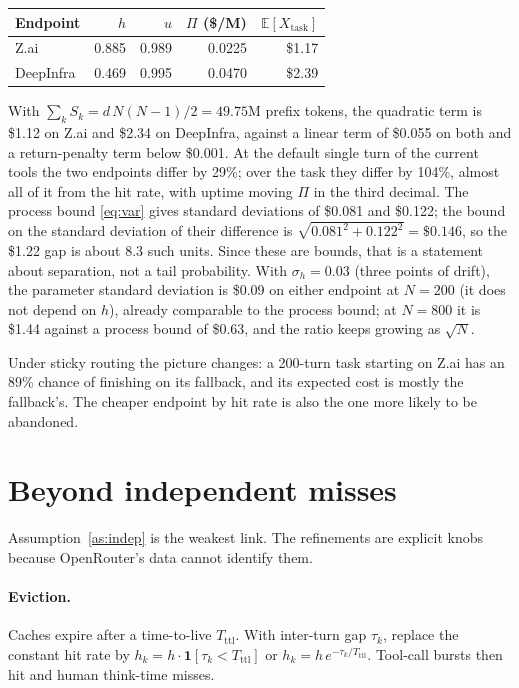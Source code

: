 \documentclass[11pt]{article}
\newcommand{\E}{\mathbb{E}}
\newcommand{\ind}{\mathbf{1}}
\begin{document}
\begin{center}
\begin{tabular}{@{}lrrrr@{}}
\toprule
Endpoint & $h$ & $u$ & $\Pi$ (\$/M) & $\E[X_{\text{task}}]$ \\
\midrule
Z.ai      & 0.885 & 0.989 & 0.0225 & \$1.17 \\
DeepInfra & 0.469 & 0.995 & 0.0470 & \$2.39 \\
\bottomrule
\end{tabular}
\end{center}

With $\sum_k S_k = d\,N(N-1)/2 = 49.75$M prefix tokens, the quadratic term is
\$1.12 on Z.ai and \$2.34 on DeepInfra, against a linear term of \$0.055 on
both and a return-penalty term below \$0.001. At the default single turn of the
current tools the two endpoints differ by 29\%; over the task they differ by
104\%, almost all of it from the hit rate, with uptime moving $\Pi$ in the
third decimal. The process bound \eqref{eq:var} gives standard deviations of
\$0.081 and \$0.122; the bound on the standard deviation of their difference is
$\sqrt{0.081^2 + 0.122^2} = \$0.146$, so the \$1.22 gap is about 8.3 such
units. Since these are bounds, that is a statement about separation, not a tail
probability. With $\sigma_h = 0.03$ (three points of drift), the parameter
standard deviation is \$0.09 on either endpoint at $N = 200$ (it does not
depend on $h$), already comparable to the process bound; at $N = 800$ it is
\$1.44 against a process bound of \$0.63, and the ratio keeps growing as
$\sqrt{N}$.

Under \textsf{sticky} routing the picture changes: a 200-turn task starting on
Z.ai has an 89\% chance of finishing on its fallback, and its expected cost is
mostly the fallback's. The cheaper endpoint by hit rate is also the one more
likely to be abandoned.

\section{Beyond independent misses}\label{sec:beyond}

Assumption~\ref{as:indep} is the weakest link. The refinements are explicit
knobs because OpenRouter's data cannot identify them.

\paragraph{Eviction.}
Caches expire after a time-to-live $T_{\text{ttl}}$. With inter-turn gap
$\tau_k$, replace the constant hit rate by
$h_k = h \cdot \ind[\tau_k < T_{\text{ttl}}]$ or $h_k = h\, e^{-\tau_k / T_{\text{ttl}}}$.
Tool-call bursts then hit and human think-time misses.
\end{document}
